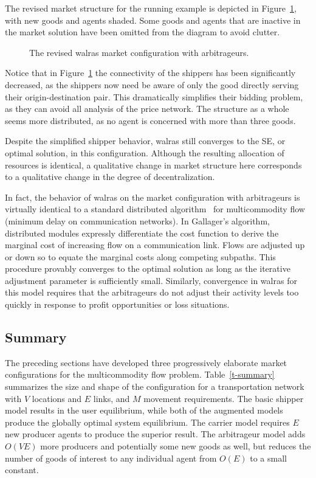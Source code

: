 The revised market structure
for the running example is depicted in Figure~\ref{fig:arbitrage},
with new goods and agents shaded.  Some goods and agents that are
inactive in the market solution have been omitted from the diagram to
avoid clutter.

\begin{figure}[htbp]
\centerline{}
\caption{The revised {\sc walras} market configuration with arbitrageurs.}
\label{fig:arbitrage}
\end{figure}

Notice that in Figure~\ref{fig:arbitrage} the connectivity of the
shippers has been significantly decreased, as the shippers now need
be aware of only the good directly serving their origin-destination
pair.  This dramatically simplifies their bidding problem, as they can
avoid all analysis of the price network.  The structure as a whole
seems more distributed, as no agent is concerned with more than three
goods.

Despite the simplified shipper behavior, {\sc walras} still converges
to the SE, or optimal solution, in this configuration.  Although the
resulting allocation of resources is identical, a qualitative change
in market structure here corresponds to a qualitative change in the
degree of decentralization.

In fact, the behavior of {\sc walras} on the market configuration with
arbitrageurs is virtually identical to a standard distributed
algorithm~\cite{Gallager77} for multicommodity flow (minimum delay on
communication networks).  In Gallager's algorithm, 
distributed modules expressly differentiate the cost function to derive 
the marginal cost of increasing flow on a communication link.  Flows are 
adjusted up or down so to equate the marginal costs along competing 
subpaths.  This procedure
provably converges to the optimal solution as long as the iterative
adjustment parameter is sufficiently small.  Similarly, convergence in
{\sc walras} for this model requires that the arbitrageurs do not adjust
their activity levels too quickly in response to profit opportunities
or loss situations.

\subsection{Summary}

The preceding sections have developed three progressively elaborate 
market configurations for the multicommodity flow problem.  
Table~\ref{t-summary} summarizes the size and shape of the configuration 
for a transportation network with $V$ locations and $E$ 
links, and $M$ movement requirements.  The basic shipper model results in 
the user equilibrium, while both of the augmented models produce the 
globally optimal system equilibrium.  The carrier model requires $E$ new 
producer agents to produce the superior result.  The arbitrageur model 
adds $O(VE)$ more producers and potentially some new goods as well, but 
reduces the number of goods of interest to any individual agent from $O(E)$ to a 
small constant.

